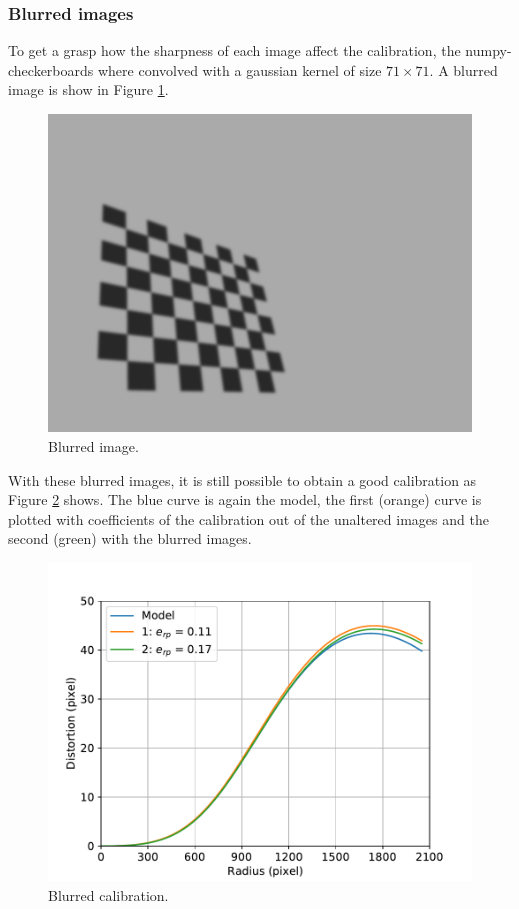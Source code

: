 \subsubsection{Blurred images}
To get a grasp how the sharpness of each image affect the calibration, the numpy-checkerboards where convolved with a gaussian kernel of size $71\times 71$.
A blurred image is show in Figure \ref{development:nump_blurred}.
\begin{figure}[ht]
	\centering
	\includegraphics[width=0.9\linewidth]{3-development/calibration/images/nump1_blurred.png}
	\caption{Blurred image.\label{development:nump_blurred}}
\end{figure}
With these blurred images, it is still possible to obtain a good calibration as Figure \ref{development:blurred} shows.
The blue curve is again the model, the first (orange) curve is plotted with coefficients of the calibration out of the unaltered images and the second (green) with the blurred images.
\begin{figure}[ht]
	\centering
	\includegraphics[width=0.9\linewidth]{3-development/calibration/images/blurred.pdf}
	\caption{Blurred calibration.\label{development:blurred}}
\end{figure}

